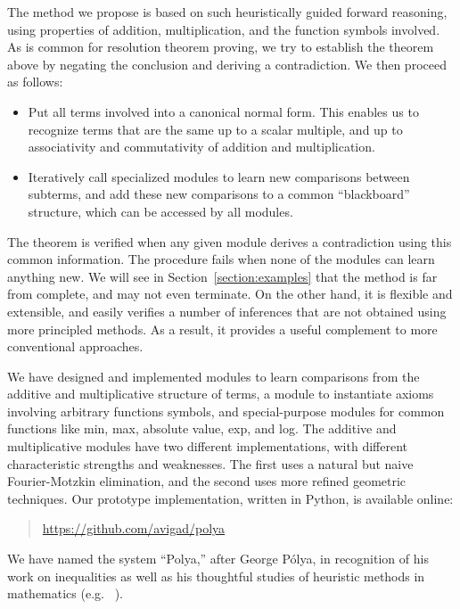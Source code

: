 \documentclass[runningheds]{llncs}
\begin{document}
The method we propose is based on such heuristically guided forward reasoning, using properties of addition, multiplication, and the function symbols involved. As is common for resolution theorem proving, we try to establish the theorem above by negating the conclusion and deriving a contradiction. We then proceed as follows:
\begin{itemize}
 \item Put all terms involved into a canonical normal form. This enables us to recognize terms that are the same up to a scalar multiple, and up to associativity and commutativity of addition and multiplication.
 \item Iteratively call specialized modules to learn new comparisons between subterms, and add these new comparisons to a common ``blackboard'' structure, which can be accessed by all modules.
\end{itemize}
The theorem is verified when any given module derives a contradiction using this common information. The procedure fails when none of the modules can learn anything new. We will see in Section~\ref{section:examples} that the method is far from complete, and may not even terminate. On the other hand, it is flexible and extensible, and easily verifies a number of inferences that are not obtained using more principled methods. As a result, it provides a useful complement to more conventional approaches.

We have designed and implemented modules to learn comparisons from the additive and multiplicative structure of terms, a module to instantiate axioms involving arbitrary functions symbols, and special-purpose modules for common functions like min, max, absolute value, exp, and log. The additive and multiplicative modules have two different implementations, with different characteristic strengths and weaknesses. The first uses a natural but naive Fourier-Motzkin elimination, and the second uses more refined geometric techniques. Our prototype implementation, written in Python, is available online:
\begin{quote}
 \url{https://github.com/avigad/polya}
\end{quote}
We have named the system ``Polya,'' after George P\'olya, in recognition of his work on inequalities as well as his thoughtful studies of heuristic methods in mathematics (e.g.~\cite{hardy:littlewood:88} \cite{polya:04}).
\end{document}

